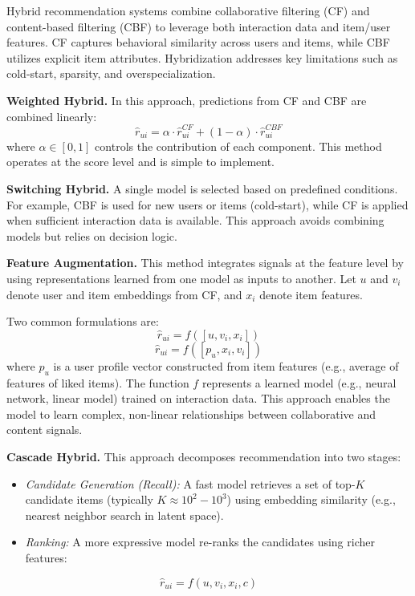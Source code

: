 \documentclass[10pt,a4paper]{article}
\begin{document}
	Hybrid recommendation systems combine collaborative filtering (CF) and content-based filtering (CBF) to leverage both interaction data and item/user features. CF captures behavioral similarity across users and items, while CBF utilizes explicit item attributes. Hybridization addresses key limitations such as cold-start, sparsity, and overspecialization.
	
	\textbf{Weighted Hybrid.} 
	In this approach, predictions from CF and CBF are combined linearly:
	\[
	\hat{r}_{ui} = \alpha \cdot \hat{r}^{CF}_{ui} + (1 - \alpha)\cdot \hat{r}^{CBF}_{ui}
	\]
	where $\alpha \in [0,1]$ controls the contribution of each component. This method operates at the score level and is simple to implement.
	
	\textbf{Switching Hybrid.} 
	A single model is selected based on predefined conditions. For example, CBF is used for new users or items (cold-start), while CF is applied when sufficient interaction data is available. This approach avoids combining models but relies on decision logic.
	
	\textbf{Feature Augmentation.} 
	This method integrates signals at the feature level by using representations learned from one model as inputs to another. Let $u$ and $v_i$ denote user and item embeddings from CF, and $x_i$ denote item features.
	
	Two common formulations are:
	\[
	\hat{r}_{ui} = f([u, v_i, x_i])
	\]
	\[
	\hat{r}_{ui} = f([p_u, x_i, v_i])
	\]
	where $p_u$ is a user profile vector constructed from item features (e.g., average of features of liked items). The function $f$ represents a learned model (e.g., neural network, linear model) trained on interaction data. This approach enables the model to learn complex, non-linear relationships between collaborative and content signals.
	
	\textbf{Cascade Hybrid.} 
	This approach decomposes recommendation into two stages:
	
	\begin{itemize}
	    \item \textit{Candidate Generation (Recall):} A fast model retrieves a set of top-$K$ candidate items (typically $K \approx 10^2 - 10^3$) using embedding similarity (e.g., nearest neighbor search in latent space).
	    \item \textit{Ranking:} A more expressive model re-ranks the candidates using richer features:
	\end{itemize}
	
	\[
	\hat{r}_{ui} = f(u, v_i, x_i, c)
	\]
	
\end{document}
